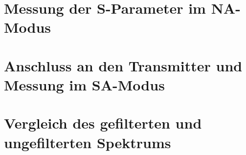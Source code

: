 \section{Messung der S-Parameter im NA-Modus}
\section{Anschluss an den Transmitter und Messung im SA-Modus}
\section{Vergleich des gefilterten und ungefilterten Spektrums}
